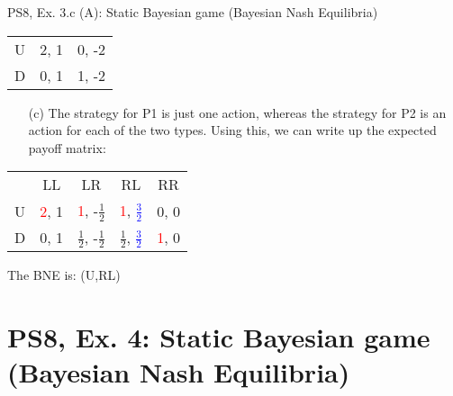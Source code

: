 \begin{frame}{PS8, Ex. 3.c (A): Static Bayesian game (Bayesian Nash Equilibria)}
\begin{multicols}{2}
\begin{table}
\begin{tabular}{l|c|c|}
          U & 2, 1 & 0, -2 \\\cline{2-3}
          D & 0, 1 & 1, -2 \\\cline{2-3}
        \end{tabular}
      \end{table}
      \vspace{-8pt}
      \begin{itemize}
          \item[(c)] The strategy for P1 is just one action, whereas the strategy for P2 is an action for each of the two types. Using this, we can write up the expected payoff matrix:
      \end{itemize}
      \vspace{-12pt}
      \begin{table}
        \begin{tabular}{l|c|c|c|c|}
          \multicolumn{1}{c}{} & \multicolumn{1}{c}{LL} & \multicolumn{1}{c}{LR} & \multicolumn{1}{c}{RL} & \multicolumn{1}{c}{RR} \\\cline{2-5}
          U & \textcolor{red}{2}, 1 &  \textcolor{red}{1}, -$\frac{1}{2}$ & \textcolor{red}{1}, \textcolor{blue}{$\frac{3}{2}$} & 0, 0  \\\cline{2-5}
          D & 0, 1  & $\frac{1}{2}$, -$\frac{1}{2}$ & $\frac{1}{2}$, \textcolor{blue}{$\frac{3}{2}$} & \textcolor{red}{1}, 0  \\\cline{2-5}
        \end{tabular}
      \end{table}
      \vspace{-4pt}
      The BNE is: (U,RL)
      \vfill\null
    \end{multicols}
\end{frame}



\section{PS8, Ex. 4: Static Bayesian game (Bayesian Nash Equilibria)}

